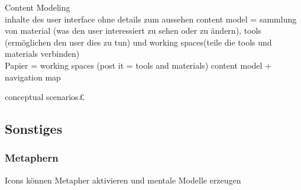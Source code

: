  Content Modeling \\
 inhalte des user interface ohne details zum aussehen
 content model = sammlung von material (was den user interessiert zu sehen oder zu ändern), tools (ermöglichen den user dies zu tun) und working spaces(teile die tools und materials verbinden)\\

 Papier = working spaces (post it = tools and materials)
 content model + navigation map

 conceptual scenarios£

\subsection{Sonstiges}

\subsubsection{Metaphern}
Icons können Metapher aktivieren und mentale Modelle erzeugen

